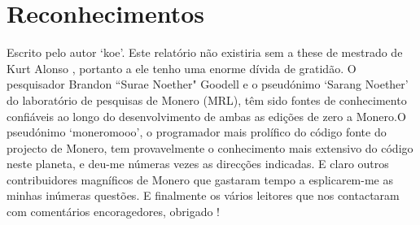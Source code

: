 \section{Reconhecimentos}
\label{sec:acknowledgements}

Escrito pelo autor `koe'.
Este relatório não existiria sem a these de mestrado de Kurt Alonso \cite{kurt-original}, portanto a ele tenho uma enorme dívida de gratidão. O pesquisador Brandon ``Surae Noether" Goodell e o pseudónimo `Sarang Noether' do laboratório de pesquisas de Monero (MRL), têm sido fontes de conhecimento confiáveis ao longo do  desenvolvimento de ambas as edições de zero a Monero.\newline O pseudónimo `moneromooo', o programador mais prolífico do código fonte do projecto de Monero, tem provavelmente o conhecimento mais extensivo do código neste planeta, e deu-me númeras vezes as direcções indicadas. E claro outros contribuidores magníficos de Monero que gastaram tempo a esplicarem-me as minhas inúmeras questões. E finalmente os vários leitores que nos contactaram com comentários encoragedores, obrigado !         

